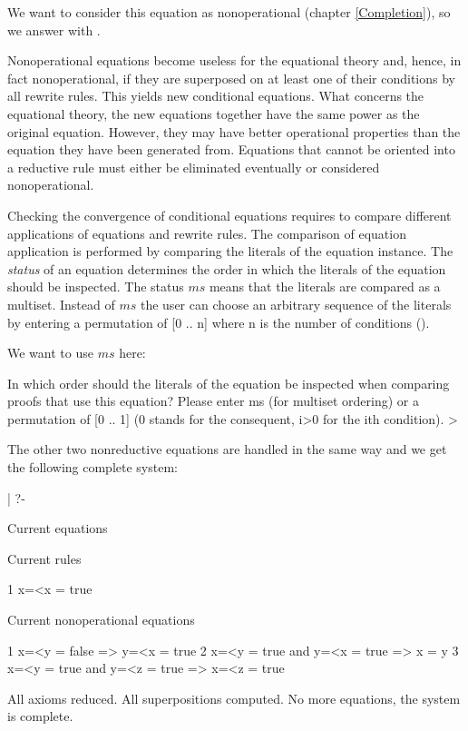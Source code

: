 \noindent
We want to consider this equation as nonoperational
( chapter \ref{Completion}), so we answer with .

Nonoperational equations become useless for the equational theory and, hence,
in fact nonoperational, if they are superposed on at least one of their
conditions by all rewrite rules. This yields new conditional equations. 
What concerns the equational theory, the new equations together have 
the same power as the original equation. 
However, they may have better operational properties than the
equation they have been generated from.
Equations that cannot be oriented into a reductive rule must
either be eliminated eventually or considered nonoperational.

Checking the convergence of conditional equations requires to compare different
applications of equations and rewrite rules. The comparison of equation application is performed
by comparing the literals of the equation instance. The {\em status} of an equation 
determines the order in which the literals of the equation should be
inspected. The status $ms$ means that the literals are compared as a multiset.
Instead of $ms$ the user can choose an arbitrary sequence of the literals
by entering a permutation of [0 .. n] where n is the number of conditions
( \cite{Gan88a}). 

We want to use $ms$ here:

\begin{screen}
In which order should the literals of the equation be
inspected when comparing proofs that use this equation?
Please enter ms (for multiset ordering) or a permutation of [0 .. 1]
(0 stands for the consequent, i>0 for the ith condition). > 
\end{screen}

\noindent
The other two nonreductive equations are handled in the same way and we get the 
following complete system:

\begin{screen}
| ?- 

Current equations

Current rules

  1    x=<x = true

Current nonoperational equations

  1    x=<y = false => y=<x = true
  2    x=<y = true and y=<x = true => x = y
  3    x=<y = true and y=<z = true => x=<z = true

All axioms reduced.
All superpositions computed.
No more equations, the system is complete.
\end{screen}

